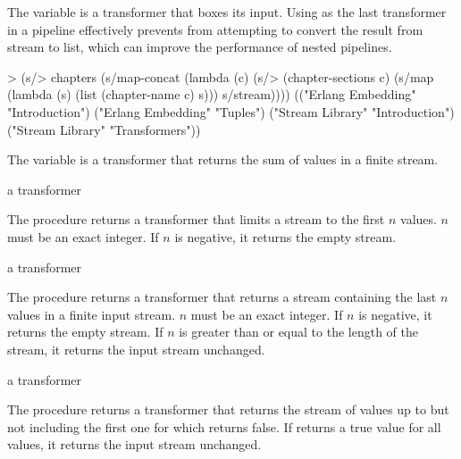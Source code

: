 \begin{variable}
\end{variable}
\antipar

The  variable is a transformer that boxes its input. Using 
as the last transformer in a pipeline effectively prevents  from attempting to
convert the result from stream to list, which can improve the performance of nested pipelines.

\codebegin
> (s/> chapters
    (s/map-concat
     (lambda (c)
       (s/> (chapter-sections c)
         (s/map (lambda (s) (list (chapter-name c) s)))
         s/stream))))
(("Erlang Embedding" "Introduction")
 ("Erlang Embedding" "Tuples")
 ("Stream Library" "Introduction")
 ("Stream Library" "Transformers"))
\codeend

\begin{variable}
\end{variable}
\antipar

The  variable is a transformer that returns the sum of values in a finite
stream.

\begin{procedure}
\end{procedure}
\returns{} a transformer

The  procedure returns a transformer that limits a stream to the first $n$
values. $n$ must be an exact integer. If $n$ is negative, it returns the empty stream.

\begin{procedure}
\end{procedure}
\returns{} a transformer

The  procedure returns a transformer that returns a stream containing
the last $n$ values in a finite input stream. $n$ must be an exact integer. If $n$ is
negative, it returns the empty stream. If $n$ is greater than or equal to the length of
the stream, it returns the input stream unchanged.

\begin{procedure}
\end{procedure}
\returns{} a transformer

The  procedure returns a transformer that returns the stream of values
up to but not including the first one for which  returns false. If
 returns a true value for all values, it returns the input stream
unchanged.

